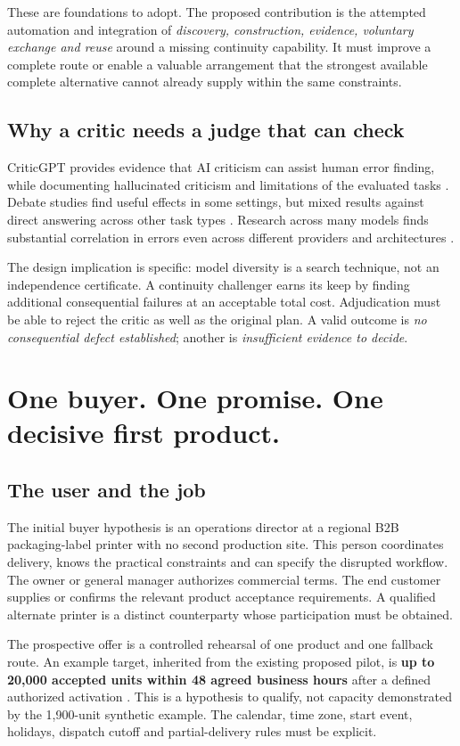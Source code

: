 \documentclass[11pt,a4paper]{article}
\newcommand{\chapterpage}{\clearpage}
\begin{document}
These are foundations to adopt. The proposed contribution is the attempted automation and integration of \emph{discovery, construction, evidence, voluntary exchange and reuse} around a missing continuity capability. It must improve a complete route or enable a valuable arrangement that the strongest available complete alternative cannot already supply within the same constraints.

\subsection{Why a critic needs a judge that can check}
CriticGPT provides evidence that AI criticism can assist human error finding, while documenting hallucinated criticism and limitations of the evaluated tasks \cite{criticGPT}. Debate studies find useful effects in some settings, but mixed results against direct answering across other task types \cite{kenton}. Research across many models finds substantial correlation in errors even across different providers and architectures \cite{correlated}.

The design implication is specific: model diversity is a search technique, not an independence certificate. A continuity challenger earns its keep by finding additional consequential failures at an acceptable total cost. Adjudication must be able to reject the critic as well as the original plan. A valid outcome is \emph{no consequential defect established}; another is \emph{insufficient evidence to decide}.

\chapterpage
\section{One buyer. One promise. One decisive first product.}\label{sec:v1}
\subsection{The user and the job}
The initial buyer hypothesis is an operations director at a regional B2B packaging-label printer with no second production site. This person coordinates delivery, knows the practical constraints and can specify the disrupted workflow. The owner or general manager authorizes commercial terms. The end customer supplies or confirms the relevant product acceptance requirements. A qualified alternate printer is a distinct counterparty whose participation must be obtained.

The prospective offer is a controlled rehearsal of one product and one fallback route. An example target, inherited from the existing proposed pilot, is \textbf{up to 20,000 accepted units within 48 agreed business hours} after a defined authorized activation \cite{handoffPilot}. This is a hypothesis to qualify, not capacity demonstrated by the 1,900-unit synthetic example. The calendar, time zone, start event, holidays, dispatch cutoff and partial-delivery rules must be explicit.
\end{document}
